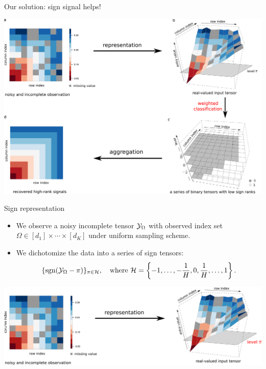 \documentclass[10pt, mathserif]{beamer} %
\theoremstyle{definition}
\theoremstyle{plain}
\def\sign{\textup{sgn}}
\begin{document}
\begin{frame}{Our solution: sign signal helps!}
     \begin{center}
 \includegraphics[width =\textwidth]{Figures/mainidea.pdf}
         \end{center}
 \end{frame}

\begin{frame}{Sign representation}
\begin{itemize}
    \item We observe {\color{red}a noisy incomplete tensor} $\mathcal{Y}_\Omega$ with observed index set $\Omega\in[d_1]\times\cdots\times[d_K]$ under uniform sampling scheme. 
    \item We dichotomize the data into {\color{red}a series of sign tensors}:
\[
\{\sign(\tY_\Omega-\pi)\}_{\pi\in \tH}, \quad \text{where}\ \tH=\left\{-1,\ldots, -{1\over H}, 0, {1\over H}, \ldots, 1\right\}. 
\]
\end{itemize}
        
  \begin{center}
    \includegraphics[width =\textwidth]{Figures/representation.pdf}
    \end{center}
\end{frame}
\end{document}
